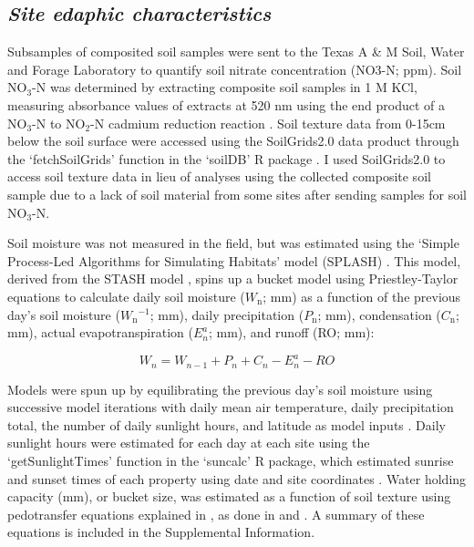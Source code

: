 \subsection{\textit{Site edaphic characteristics}}
\noindent Subsamples of composited soil samples were sent to the Texas A \& M Soil, Water and Forage Laboratory to quantify soil nitrate concentration (NO3-N; ppm). Soil NO$_{3}$-N was determined by extracting composite soil samples in 1 M KCl, measuring absorbance values of extracts at 520 nm using the end product of a NO$_{3}$-N to NO$_{2}$-N cadmium reduction reaction . Soil texture data from 0-15cm below the soil surface were accessed using the SoilGrids2.0 data product  through the ‘fetchSoilGrids’ function in the ‘soilDB’ R package . I used SoilGrids2.0 to access soil texture data in lieu of analyses using the collected composite soil sample due to a lack of soil material from some sites after sending samples for soil NO$_{3}$-N.

Soil moisture was not measured in the field, but was estimated using the ‘Simple Process-Led Algorithms for Simulating Habitats’ model (SPLASH) . This model, derived from the STASH model , spins up a bucket model using Priestley-Taylor equations  to calculate daily soil moisture ($W_\mathrm{n}$; mm) as a function of the previous day’s soil moisture ($W_\mathrm{n}{}^{-1}$; mm), daily precipitation ($P_\mathrm{n}$; mm), condensation ($C_\mathrm{n}$; mm), actual evapotranspiration ($E_{n}^a$; mm), and runoff (RO; mm):

\begin{equation}
    \label{eq_4.7}
    W_n = W_{n-1} + P_n + C_n - E_{n}^{a} - RO
\end{equation}

\noindent Models were spun up by equilibrating the previous day's soil moisture using successive model iterations with daily mean air temperature, daily precipitation total, the number of daily sunlight hours, and latitude as model inputs . Daily sunlight hours were estimated for each day at each site using the ‘getSunlightTimes’ function in the ‘suncalc’ R package, which estimated sunrise and sunset times of each property using date and site coordinates . Water holding capacity (mm), or bucket size, was estimated as a function of soil texture using pedotransfer equations explained in , as done in  and . A summary of these equations is included in the Supplemental Information.

